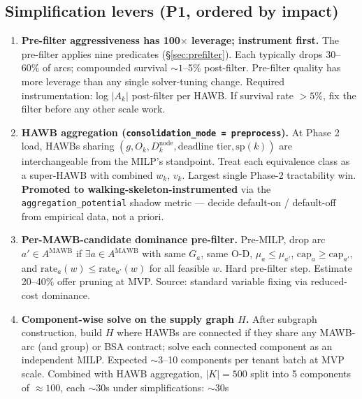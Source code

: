 \documentclass[11pt,a4paper]{article}
\theoremstyle{definition}
\begin{document}
\subsection*{Simplification levers (P1, ordered by impact)}

\begin{enumerate}
  \item \label{item:scale-prefilter} \textbf{Pre-filter aggressiveness has
        100$\times$ leverage; instrument first.} The pre-filter applies nine
        predicates (\S\ref{sec:prefilter}). Each typically drops 30--60\% of
        arcs; compounded survival $\sim 1$--5\% post-filter. Pre-filter
        quality has more leverage than any single solver-tuning change.
        Required instrumentation: log $|A_k|$ post-filter per HAWB. If
        survival rate $> 5\%$, fix the filter before any other scale work.
  \item \label{item:scale-hawb-aggregation} \textbf{HAWB aggregation
        (\texttt{consolidation\_mode = preprocess}).} At Phase 2 load,
        HAWBs sharing $(g, O_k, D_k^{\text{node}}, \text{deadline tier},
        \text{sp}(k))$ are interchangeable from the MILP's standpoint.
        Treat each equivalence class as a super-HAWB with combined $w_k$,
        $v_k$. Largest single Phase-2 tractability win.
        \textbf{Promoted to walking-skeleton-instrumented} via the
        \texttt{aggregation\_potential} shadow metric --- decide
        default-on / default-off from empirical data, not a priori.
  \item \label{item:scale-bucket-dominance} \textbf{Per-MAWB-candidate
        dominance pre-filter.} Pre-MILP, drop arc $a' \in A^{\text{MAWB}}$
        if $\exists a \in A^{\text{MAWB}}$ with same $G_a$, same O-D,
        $\mu_a \leq \mu_{a'}$, $\text{cap}_a \geq \text{cap}_{a'}$, and
        $\text{rate}_a(w) \leq \text{rate}_{a'}(w)$ for all feasible $w$.
        Hard pre-filter step. Estimate 20--40\% offer pruning at MVP.
        Source: standard variable fixing via reduced-cost dominance.
  \item \label{item:scale-component-decomposition} \textbf{Component-wise
        solve on the supply graph $H$.} After subgraph construction, build
        $H$ where HAWBs are connected if they share any MAWB-arc (and group)
        or BSA contract; solve each connected component as an independent
        MILP. Expected $\sim 3$--10 components per tenant batch at MVP scale.
        Combined with HAWB aggregation, $|K| = 500$ split into 5 components
        of $\approx 100$, each $\sim 30$s under simplifications: $\sim 30$s

\end{enumerate}
\end{document}
